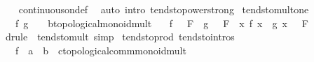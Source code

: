 \begin{isabellebody}
%
\isadelimproof
\ \ %
\endisadelimproof
%
\isatagproof
{}\isamarkupfalse%
\ continuous{\isacharunderscore}{\kern0pt}on{\isacharunderscore}{\kern0pt}def\ \isamarkupfalse%
\ {\isacharparenleft}{\kern0pt}auto\ intro{\isacharcolon}{\kern0pt}\ tendsto{\isacharunderscore}{\kern0pt}power{\isacharunderscore}{\kern0pt}strong{\isacharparenright}{\kern0pt}%
\endisatagproof
{\isafoldproof}%
%
\isadelimproof
\isanewline
%
\endisadelimproof
\isanewline
{}\isamarkupfalse%
\ tendsto{\isacharunderscore}{\kern0pt}mult{\isacharunderscore}{\kern0pt}one{\isacharcolon}{\kern0pt}\isanewline
\ \ \ f\ g\ {\isacharcolon}{\kern0pt}{\isacharcolon}{\kern0pt}\ {\isachardoublequoteopen}{\isacharunderscore}{\kern0pt}\ {\isasymRightarrow}\ {\isacharprime}{\kern0pt}b{\isacharcolon}{\kern0pt}{\isacharcolon}{\kern0pt}topological{\isacharunderscore}{\kern0pt}monoid{\isacharunderscore}{\kern0pt}mult{\isachardoublequoteclose}\isanewline
\ \ \ {\isachardoublequoteopen}{\isacharparenleft}{\kern0pt}f\ {\isasymlonglongrightarrow}\ {}{\isacharparenright}{\kern0pt}\ F\ {\isasymLongrightarrow}\ {\isacharparenleft}{\kern0pt}g\ {\isasymlonglongrightarrow}\ {}{\isacharparenright}{\kern0pt}\ F\ {\isasymLongrightarrow}\ {\isacharparenleft}{\kern0pt}{\isacharparenleft}{\kern0pt}{\isasymlambda}x{\isachardot}{\kern0pt}\ f\ x\ {\isacharasterisk}{\kern0pt}\ g\ x{\isacharparenright}{\kern0pt}\ {\isasymlonglongrightarrow}\ {}{\isacharparenright}{\kern0pt}\ F{\isachardoublequoteclose}\isanewline
%
\isadelimproof
\ \ %
\endisadelimproof
%
\isatagproof
{}\isamarkupfalse%
\ {\isacharparenleft}{\kern0pt}drule\ {\isacharparenleft}{\kern0pt}{}{\isacharparenright}{\kern0pt}\ tendsto{\isacharunderscore}{\kern0pt}mult{\isacharparenright}{\kern0pt}\ simp%
\endisatagproof
{\isafoldproof}%
%
\isadelimproof
\isanewline
%
\endisadelimproof
\isanewline
{}\isamarkupfalse%
\ tendsto{\isacharunderscore}{\kern0pt}prod{\isacharprime}{\kern0pt}\ {\isacharbrackleft}{\kern0pt}tendsto{\isacharunderscore}{\kern0pt}intros{\isacharbrackright}{\kern0pt}{\isacharcolon}{\kern0pt}\isanewline
\ \ \ f\ {\isacharcolon}{\kern0pt}{\isacharcolon}{\kern0pt}\ {\isachardoublequoteopen}{\isacharprime}{\kern0pt}a\ {\isasymRightarrow}\ {\isacharprime}{\kern0pt}b\ {\isasymRightarrow}\ {\isacharprime}{\kern0pt}c{\isacharcolon}{\kern0pt}{\isacharcolon}{\kern0pt}topological{\isacharunderscore}{\kern0pt}comm{\isacharunderscore}{\kern0pt}monoid{\isacharunderscore}{\kern0pt}mult{\isachardoublequoteclose}\isanewline

\end{isabellebody}
